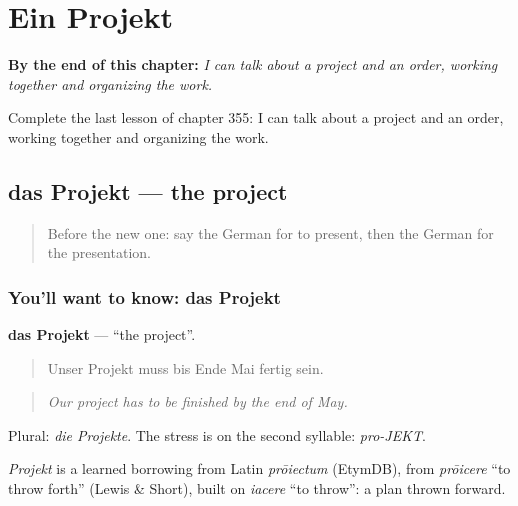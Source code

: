 
\chapter{Ein Projekt}
\label{ch:ge-ein-projekt}

\begin{chapteropening}
\textbf{By the end of this chapter:} \emph{I can talk about a project and an order, working together and organizing the work.}

Complete the last lesson of chapter 355: I can talk about a project and an order, working together and organizing the work.
\end{chapteropening}

\section[das Projekt]{das Projekt — the project}

\label{lesson:GE-C355-projekt}



\begin{quote}
Before the new one: say the German for to present, then the German for the presentation.
\end{quote}

\subsection*{You'll want to know: das Projekt}
\textbf{das Projekt} — \textquotedblleft{}the project\textquotedblright{}.

\begin{quote}
Unser Projekt muss bis Ende Mai fertig sein.
\end{quote}

\begin{quote}
\emph{Our project has to be finished by the end of May.}
\end{quote}

Plural: \emph{die Projekte}. The stress is on the second syllable: \emph{pro-JEKT}.

\begin{cousinweb}
\emph{Projekt} is a learned borrowing from Latin \emph{prōiectum} (EtymDB), from \emph{prōicere} \textquotedblleft{}to throw forth\textquotedblright{} (Lewis \& Short), built on \emph{iacere} \textquotedblleft{}to throw\textquotedblright{}: a plan thrown forward.
\end{cousinweb}

